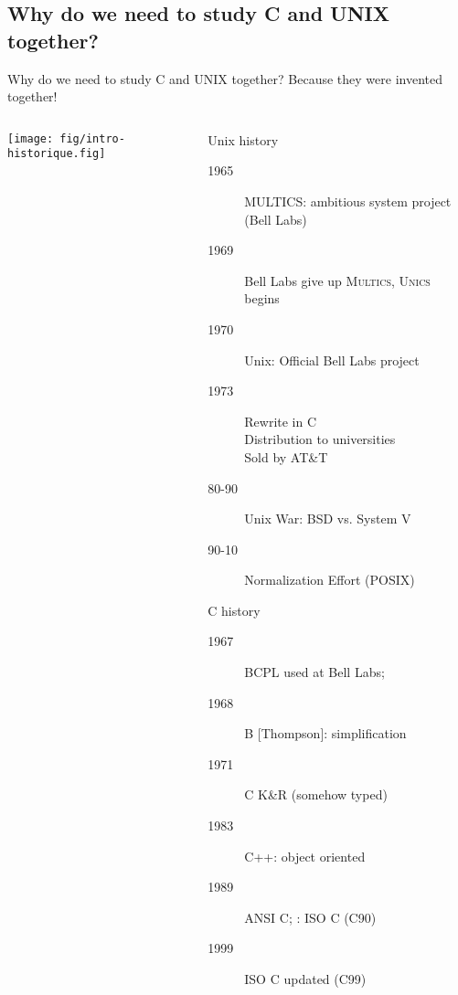 \subsection{Why do we need to study C and UNIX together?}
\begin{frame}[squeeze]{Why do we need to study C and UNIX together?}
  \alert{\large Because they were invented together!}
  \vspace{-1.5\baselineskip}

    \begin{columns}
    \begin{column}{.55\linewidth}
      \texttt{[image: fig/intro-historique.fig]}      
    \end{column}
    \begin{column}{.45\linewidth}
      \begin{block}{Unix history}        
        \begin{description}
        \item[1965] MULTICS: ambitious system project {\small(Bell Labs)}
        \item[1969] Bell Labs give up  \textsc{Multics}, 
          \textsc{Unics} begins 
        \item[1970] Unix: Official  Bell Labs project
        \item[1973] Rewrite in C\\
          Distribution to universities\\
          Sold by AT\&T
        \item[80-90] Unix War: {\small BSD vs. System V}\\
        \item[90-10] Normalization Effort (POSIX)
        \end{description}
      \end{block}\vspace{-\baselineskip}

      \begin{block}{C history}
        \begin{description}
        \item[1967] BCPL used at Bell Labs; 
        \item[1968] B [Thompson]: simplification
        \item[1971] C K\&R (somehow typed)
        \item[1983] C++: object oriented
        \item[1989] ANSI C; : ISO C {\small(C90)}
        \item[1999] ISO C updated {\small(C99)}
        \end{description}
      \end{block}
    \end{column}
  \end{columns}
\end{frame}
